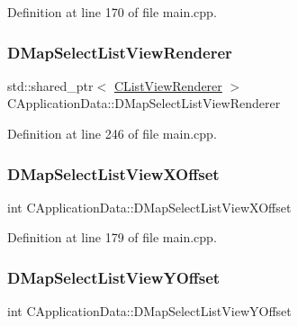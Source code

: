 Definition at line 170 of file main.\+cpp.

\hypertarget{classCApplicationData_a5e5746ba44c03038d1a392872614de14}{}\label{classCApplicationData_a5e5746ba44c03038d1a392872614de14} 
\subsubsection{\texorpdfstring{D\+Map\+Select\+List\+View\+Renderer}{DMapSelectListViewRenderer}}
{\footnotesize\ttfamily std\+::shared\+\_\+ptr$<$ \hyperlink{classCListViewRenderer}{C\+List\+View\+Renderer} $>$ C\+Application\+Data\+::\+D\+Map\+Select\+List\+View\+Renderer\hspace{0.3cm}{\ttfamily [protected]}}



Definition at line 246 of file main.\+cpp.

\hypertarget{classCApplicationData_aa5a89b442e384acdf1c2aefc7ce4233b}{}\label{classCApplicationData_aa5a89b442e384acdf1c2aefc7ce4233b} 
\subsubsection{\texorpdfstring{D\+Map\+Select\+List\+View\+X\+Offset}{DMapSelectListViewXOffset}}
{\footnotesize\ttfamily int C\+Application\+Data\+::\+D\+Map\+Select\+List\+View\+X\+Offset\hspace{0.3cm}{\ttfamily [protected]}}



Definition at line 179 of file main.\+cpp.

\hypertarget{classCApplicationData_ae1a8eb3fff3cf5bc236564925bec1c8c}{}\label{classCApplicationData_ae1a8eb3fff3cf5bc236564925bec1c8c} 
\subsubsection{\texorpdfstring{D\+Map\+Select\+List\+View\+Y\+Offset}{DMapSelectListViewYOffset}}
{\footnotesize\ttfamily int C\+Application\+Data\+::\+D\+Map\+Select\+List\+View\+Y\+Offset\hspace{0.3cm}{\ttfamily [protected]}}




